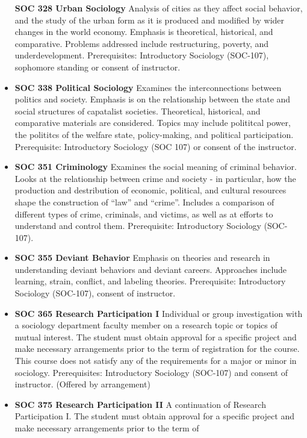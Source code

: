 \documentclass[
  letterpaper,
]{scrbook}
\begin{document}
\begin{itemize}
  \textbf{SOC 328 Urban Sociology} Analysis of cities as they affect
  social behavior, and the study of the urban form as it is produced and
  modified by wider changes in the world economy. Emphasis is
  theoretical, historical, and comparative. Problems addressed include
  restructuring, poverty, and underdevelopment. Prerequisites:
  Introductory Sociology (SOC-107), sophomore standing or consent of
  instructor.
\item
  \textbf{SOC 338 Political Sociology} Examines the interconnections
  between politics and society. Emphasis is on the relationship between
  the state and social structures of capatalist societies. Theoretical,
  historical, and comparative materials are considered. Topics may
  include polititcal power, the polititcs of the welfare state,
  policy-making, and political participation. Prerequisite: Introductory
  Sociology (SOC 107) or consent of the instructor.\\
\item
  \textbf{SOC 351 Criminology} Examines the social meaning of criminal
  behavior. Looks at the relationship between crime and society - in
  particular, how the production and destribution of economic,
  political, and cultural resources shape the construction of ``law''
  and ``crime''. Includes a comparison of different types of crime,
  criminals, and victims, as well as at efforts to understand and
  control them. Prerequisite: Introductory Sociology (SOC-107).
\item
  \textbf{SOC 355 Deviant Behavior} Emphasis on theories and research in
  understanding deviant behaviors and deviant careers. Approaches
  include learning, strain, conflict, and labeling theories.
  Prerequisite: Introductory Sociology (SOC-107), consent of instructor.
\item
  \textbf{SOC 365 Research Participation I} Individual or group
  investigation with a sociology department faculty member on a research
  topic or topics of mutual interest. The student must obtain approval
  for a specific project and make necessary arrangements prior to the
  term of registration for the course. This course does not satisfy any
  of the requirements for a major or minor in sociology. Prerequisites:
  Introductory Sociology (SOC-107) and consent of instructor. (Offered
  by arrangement)\\
\item
  \textbf{SOC 375 Research Participation II} A continuation of Research
  Participation I. The student must obtain approval for a specific
  project and make necessary arrangements prior to the term of

\end{itemize}
\end{document}
